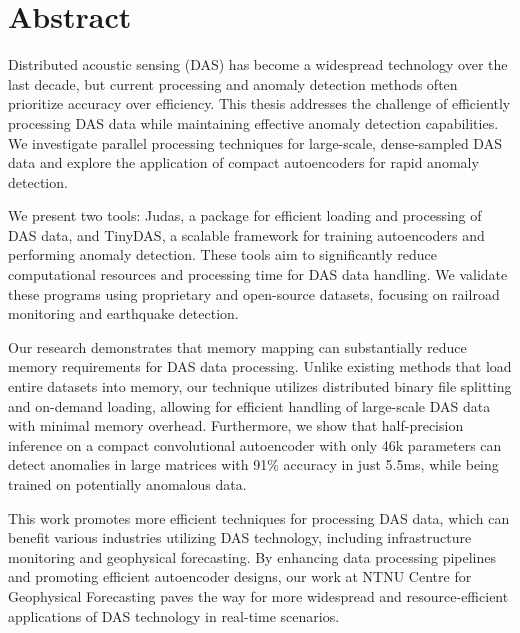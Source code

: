 \chapter*{Abstract}
Distributed acoustic sensing (DAS) has become a widespread technology over the last decade, but current processing and anomaly detection methods often prioritize accuracy over efficiency. This thesis addresses the challenge of efficiently processing DAS data while maintaining effective anomaly detection capabilities. We investigate parallel processing techniques for large-scale, dense-sampled DAS data and explore the application of compact autoencoders for rapid anomaly detection.

We present two tools: Judas, a package for efficient loading and processing of DAS data, and TinyDAS, a scalable framework for training autoencoders and performing anomaly detection. These tools aim to significantly reduce computational resources and processing time for DAS data handling. We validate these programs using proprietary and open-source datasets, focusing on railroad monitoring and earthquake detection.

Our research demonstrates that memory mapping can substantially reduce memory requirements for DAS data processing. Unlike existing methods that load entire datasets into memory, our technique utilizes distributed binary file splitting and on-demand loading, allowing for efficient handling of large-scale DAS data with minimal memory overhead. Furthermore, we show that half-precision inference on a compact convolutional autoencoder with only 46k parameters can detect anomalies in large matrices with 91\% accuracy in just 5.5ms, while being trained on potentially anomalous data.

This work promotes more efficient techniques for processing DAS data, which can benefit various industries utilizing DAS technology, including infrastructure monitoring and geophysical forecasting. By enhancing data processing pipelines and promoting efficient autoencoder designs, our work at NTNU Centre for Geophysical Forecasting paves the way for more widespread and resource-efficient applications of DAS technology in real-time scenarios.